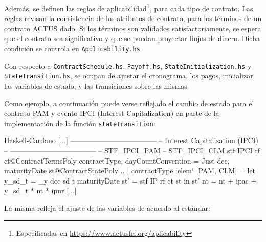 \documentclass[12pt]{book}
\begin{document}

Además, se definen las reglas de aplicabilidad\footnote{Especificadas en \url{https://www.actusfrf.org/aplicability}}, para cada tipo de contrato. Las reglas revisan la consistencia de los atributos de contrato, para los términos de un contrato ACTUS dado. Si los términos son validados satisfactoriamente, se espera que el contrato sea significativo y que se puedan proyectar flujos de dinero. Dicha condición se controla en \texttt{Applicability.hs}

Con respecto a \texttt{ContractSchedule.hs}, \texttt{Payoff.hs}, \texttt{StateInitialization.hs} y\\ \texttt{StateTransition.hs}, se ocupan de ajustar el cronograma, los pagos, inicializar las variables de estado, y las transiciones sobre las mismas.

Como ejemplo, a continuación puede verse reflejado el cambio de estado para el contrato PAM y evento IPCI (Interest Capitalization) en parte de la implementación de la función \texttt{stateTransition}:

\begin{code}[title=Parte de la función que modela la transición de estados.]{Haskell-Cardano}
        [...]
        ------------------------------------
        -- Interest Capitalization (IPCI) --
        ------------------------------------
        -- STF_IPCI_PAM
        -- STF_IPCI_CLM
        stf
          IPCI
          rf
          ct@ContractTermsPoly
            { contractType,
              dayCountConvention = Just dcc,
              maturityDate
            }
          st@ContractStatePoly
            { ..
            } | contractType `elem` [PAM, CLM] =
            let y_sd_t = _y dcc sd t maturityDate
                st' = stf IP rf ct st
             in st'
                  { nt = nt + ipac + y_sd_t * nt * ipnr
                  }
        [...]
\end{code}

La misma refleja el ajuste de las variables de acuerdo al estándar:

\begingroup
\fontsize{9pt}{9pt}\selectfont
\end{document}
